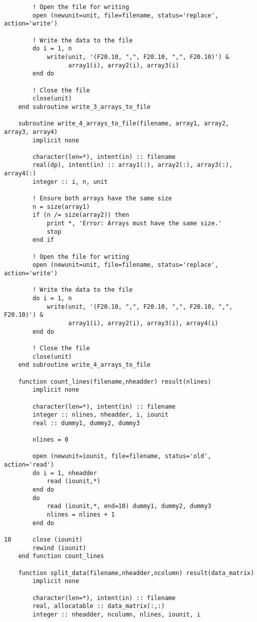 \begin{verbatim}
        ! Open the file for writing
        open (newunit=unit, file=filename, status='replace', action='write')
    
        ! Write the data to the file
        do i = 1, n
            write(unit, '(F20.10, ",", F20.10, ",", F20.10)') &
                  array1(i), array2(i), array3(i)
        end do
    
        ! Close the file
        close(unit)
    end subroutine write_3_arrays_to_file

    subroutine write_4_arrays_to_file(filename, array1, array2, array3, array4)
        implicit none

        character(len=*), intent(in) :: filename
        real(dp), intent(in) :: array1(:), array2(:), array3(:), array4(:)
        integer :: i, n, unit
    
        ! Ensure both arrays have the same size
        n = size(array1)
        if (n /= size(array2)) then
            print *, 'Error: Arrays must have the same size.'
            stop
        end if
    
        ! Open the file for writing
        open (newunit=unit, file=filename, status='replace', action='write')
    
        ! Write the data to the file
        do i = 1, n
            write(unit, '(F20.10, ",", F20.10, ",", F20.10, ",", F20.10)') &
                  array1(i), array2(i), array3(i), array4(i)
        end do
    
        ! Close the file
        close(unit)
    end subroutine write_4_arrays_to_file

    function count_lines(filename,nheadder) result(nlines)
        implicit none

        character(len=*), intent(in) :: filename
        integer :: nlines, nheadder, i, iounit
        real :: dummy1, dummy2, dummy3

        nlines = 0

        open (newunit=iounit, file=filename, status='old', action='read')
        do i = 1, nheadder
            read (iounit,*)
        end do
        do
            read (iounit,*, end=10) dummy1, dummy2, dummy3
            nlines = nlines + 1
        end do

10      close (iounit)
        rewind (iounit)
    end function count_lines

    function split_data(filename,nheadder,ncolumn) result(data_matrix)
        implicit none

        character(len=*), intent(in) :: filename
        real, allocatable :: data_matrix(:,:)
        integer :: nheadder, ncolumn, nlines, iounit, i


\end{verbatim}

